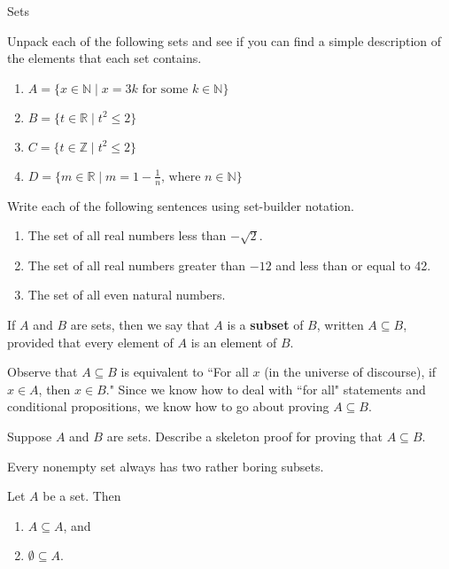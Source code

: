 \begin{section}{Sets}
\begin{problem}
Unpack each of the following sets and see if you can find a simple description of the elements that each set contains.
\begin{enumerate}[label=\textrm{(\alph*)}]
\item $A=\{x \in \mathbb{N} \mid x = 3k \mbox{ for some } k\in \mathbb{N} \}$
\item $B=\{t \in \mathbb{R} \mid t^2 \leq 2 \}$
\item $C=\{t \in \mathbb{Z} \mid t^2 \leq 2 \}$
\item $D=\{m \in \mathbb{R} \mid m = 1 - \frac{1}{n} \mbox{, where } n \in \mathbb{N} \}$
\end{enumerate}
\end{problem}

\begin{problem}
Write each of the following sentences using set-builder notation.
\begin{enumerate}[label=\textrm{(\alph*)}]
\item The set of all real numbers less than $-\sqrt{2}$. 
\item The set of all real numbers greater than $-12$ and less than or equal to 42.
\item The set of all even natural numbers.
\end{enumerate}
\end{problem}

\begin{definition}
If $A$ and $B$ are sets, then we say that $A$ is a \textbf{subset} of $B$, written $\boxed{A\subseteq B}$, provided that every element of $A$ is an element of $B$.
\end{definition}

Observe that $A\subseteq B$ is equivalent to ``For all $x$ (in the universe of discourse), if $x\in A$, then $x\in B$."  Since we know how to deal with ``for all" statements and conditional propositions, we know how to go about proving $A\subseteq B$.

\begin{problem}
Suppose $A$ and $B$ are sets.  Describe a skeleton proof for proving that $A\subseteq B$.
\end{problem}

Every nonempty set always has two rather boring subsets.

\begin{theorem}
Let $A$ be a set.  Then
\begin{enumerate}[label=\textrm{(\alph*)}]
\item $A\subseteq A$, and
\item $\emptyset \subseteq A$.
\end{enumerate}
\end{theorem}


\end{section}
